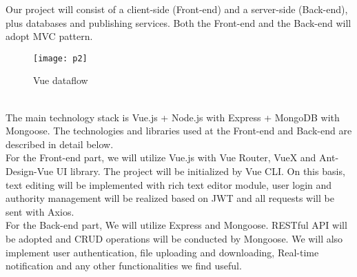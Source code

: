 Our project will consist of a client-side (Front-end) and a server-side (Back-end), plus databases and publishing services. Both the Front-end and the Back-end will adopt MVC pattern.
\begin{figure}[htp]
    \centering
    \texttt{[image: p2]}
    \caption{Vue dataflow}
    \label{fig:galaxy}
\end{figure}
\\ The main technology stack is Vue.js + Node.js with Express + MongoDB with Mongoose. The technologies and libraries used at the Front-end and Back-end are described in detail below.
\\ For the Front-end part, we will utilize Vue.js with Vue Router, VueX and Ant-Design-Vue UI library. The project will be initialized by Vue CLI. On this basis, text editing will be implemented with rich text editor module, user login and authority management will be realized based on JWT and all requests will be sent with Axios. 
\\ For the Back-end part, We will utilize Express and Mongoose. RESTful API will be adopted and CRUD operations will be conducted by Mongoose. We will also implement user authentication, file uploading and downloading, Real-time notification and any other functionalities we find useful.



